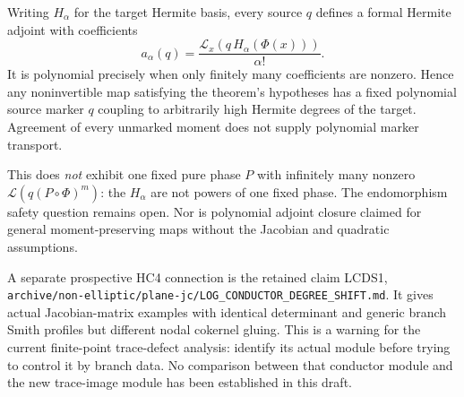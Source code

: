 \documentclass[11pt]{article}
\begin{document}
Writing $H_\alpha$ for the target Hermite basis, every source $q$ defines
a formal Hermite adjoint with coefficients
\[
 a_\alpha(q)=\frac{\mathcal L_x(q\,H_\alpha(\Phi(x)))}{\alpha!}.
\]
It is polynomial precisely when only finitely many coefficients are
nonzero. Hence any noninvertible map satisfying the theorem's hypotheses
has a fixed polynomial source marker $q$ coupling to arbitrarily high
Hermite degrees of the target. Agreement of every unmarked moment does
not supply polynomial marker transport.

This does \emph{not} exhibit one fixed pure phase $P$ with infinitely many
nonzero $\mathcal L(q(P\circ\Phi)^m)$: the $H_\alpha$ are not powers of
one fixed phase. The endomorphism safety question remains open.
Nor is polynomial adjoint closure claimed for general moment-preserving
maps without the Jacobian and quadratic assumptions.

A separate prospective HC4 connection is the retained claim LCDS1,
\texttt{archive/non-elliptic/plane-jc/LOG\_CONDUCTOR\_DEGREE\_SHIFT.md}.
It gives actual Jacobian-matrix examples with identical determinant and
generic branch Smith profiles but different nodal cokernel gluing.
This is a warning for the current finite-point trace-defect analysis:
identify its actual module before trying to control it by branch data.
No comparison between that conductor module and the new trace-image
module has been established in this draft.
\end{document}
